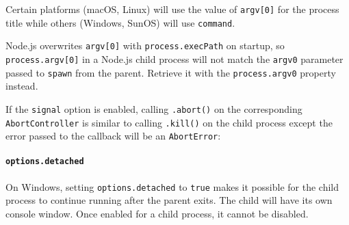 Certain platforms (macOS, Linux) will use the value of
\texttt{argv{[}0{]}} for the process title while others (Windows, SunOS)
will use \texttt{command}.

Node.js overwrites \texttt{argv{[}0{]}} with \texttt{process.execPath}
on startup, so \texttt{process.argv{[}0{]}} in a Node.js child process
will not match the \texttt{argv0} parameter passed to \texttt{spawn}
from the parent. Retrieve it with the \texttt{process.argv0} property
instead.

If the \texttt{signal} option is enabled, calling \texttt{.abort()} on
the corresponding \texttt{AbortController} is similar to calling
\texttt{.kill()} on the child process except the error passed to the
callback will be an \texttt{AbortError}:

\begin{Shaded}
\begin{Highlighting}[]
\OperatorTok{=} \NormalTok{(}\NormalTok{)}\OperatorTok{;}
\OperatorTok{=}  \NormalTok{()}\OperatorTok{;}
\OperatorTok{=}\OperatorTok{;}
\OperatorTok{=} \NormalTok{(}\OperatorTok{,}\NormalTok{ [}\NormalTok{]}\OperatorTok{,}\OperatorTok{;}
\NormalTok{(}\OperatorTok{,}\KeywordTok{=\textgreater{}}\NormalTok{ \{}
\NormalTok{\})}\OperatorTok{;}
\NormalTok{()}\OperatorTok{;} 
\end{Highlighting}
\end{Shaded}

\paragraph{\texorpdfstring{\texttt{options.detached}}{options.detached}}\label{options.detached}

On Windows, setting \texttt{options.detached} to \texttt{true} makes it
possible for the child process to continue running after the parent
exits. The child will have its own console window. Once enabled for a
child process, it cannot be disabled.

